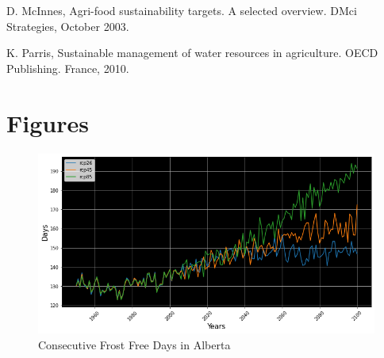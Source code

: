 \documentclass[11pt]{article}
\numberwithin{equation}{section}
\numberwithin{figure}{section}
\begin{document}

\begin{thebibliography}{99}

{\sc D. McInnes},
Agri-food sustainability targets. A selected overview. DMci Strategies, October 2003.

{\sc K. Parris},
Sustainable management of water resources in agriculture. OECD Publishing. France, 2010.

 

\end{thebibliography}

\section*{Figures}\label{figures}

\begin{figure}[h!]
\centering
\includegraphics[scale=0.4]{ABfrost}
\caption{Consecutive Frost Free Days in Alberta}
\label{ABfrostdays}
\end{figure}
\end{document}
